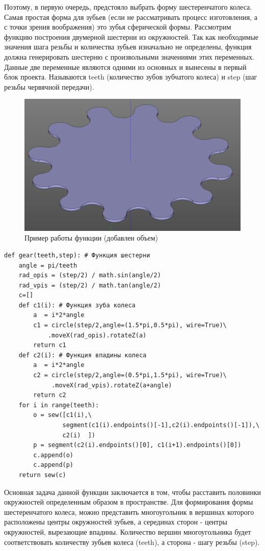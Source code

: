 Поэтому, в первую очередь, предстояло выбрать форму шестеренчатого колеса. Самая простая форма для зубьев (если не рассматривать процесс изготовления, а с точки зрения воображения) это зубья сферической формы. Рассмотрим функцию построения двумерной шестерни из окружностей. Так как необходимые значения шага резьбы и количества зубьев изначально не определены, функция должна генерировать шестерню с произвольными значениями этих переменных. Данные две переменные являются одними из основных и вынесены в первый блок проекта. Называются teeth (количество зубов зубчатого колеса) и step (шаг резьбы червячной передачи). 

\begin{figure}[h]
	\centering
	\includegraphics[width=0.8\linewidth]{./image/gear}
	\caption{Пример работы функции (добавлен объем)}
\end{figure} 

\begin{verbatim}
def gear(teeth,step): # Функция шестерни
    angle = pi/teeth
    rad_opis = (step/2) / math.sin(angle/2)
    rad_vpis = (step/2) / math.tan(angle/2)
    c=[]
    def c1(i): # Функция зуба колеса
        a  = i*2*angle
        c1 = circle(step/2,angle=(1.5*pi,0.5*pi), wire=True)\
            .moveX(rad_opis).rotateZ(a)
        return c1
    def c2(i): # Функция впадины колеса
        a  = i*2*angle
        c2 = circle(step/2,angle=(0.5*pi,1.5*pi), wire=True)\
             .moveX(rad_vpis).rotateZ(a+angle)
        return c2
    for i in range(teeth):
        o = sew([c1(i),\
                segment(c1(i).endpoints()[-1],c2(i).endpoints()[-1]),\
                c2(i)  ])
        p = segment(c2(i).endpoints()[0], c1(i+1).endpoints()[0])
        c.append(o)
        c.append(p)
    return sew(c)
\end{verbatim}

Основная задача данной функции заключается в том, чтобы расставить половинки окружностей определенным образом в пространстве. Для формирования формы шестеренчатого колеса, можно представить многоугольник в вершинах которого расположены центры окружностей зубьев, а серединах сторон - центры окружностей, вырезающие впадины. Количество вершин многоугольника будет соответствовать количеству зубьев колеса (teeth), а сторона - шагу резьбы (step). 

